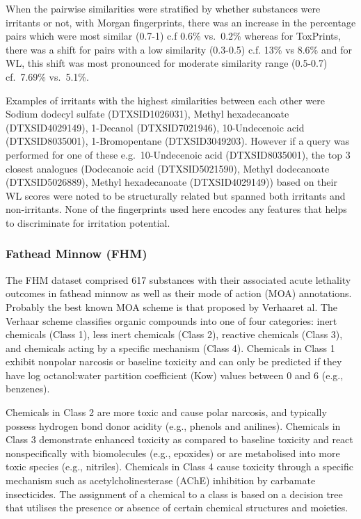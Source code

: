 \documentclass[
  super,
  preprint,
  3p]{elsarticle}
\begin{document}
When the pairwise similarities were stratified by whether substances
were irritants or not, with Morgan fingerprints, there was an increase
in the percentage pairs which were most similar (0.7-1) c.f 0.6\%
vs.~0.2\% whereas for ToxPrints, there was a shift for pairs with a low
similarity (0.3-0.5) c.f. 13\% vs 8.6\% and for WL, this shift was most
pronounced for moderate similarity range (0.5-0.7) cf.~7.69\% vs.~5.1\%.

Examples of irritants with the highest similarities between each other
were Sodium dodecyl sulfate (DTXSID1026031), Methyl hexadecanoate
(DTXSID4029149), 1-Decanol (DTXSID7021946), 10-Undecenoic acid
(DTXSID8035001), 1-Bromopentane (DTXSID3049203). However if a query was
performed for one of these e.g.~10-Undecenoic acid (DTXSID8035001), the
top 3 closest analogues (Dodecanoic acid (DTXSID5021590), Methyl
dodecanoate (DTXSID5026889), Methyl hexadecanoate (DTXSID4029149)) based
on their WL scores were noted to be structurally related but spanned
both irritants and non-irritants. None of the fingerprints used here
encodes any features that helps to discriminate for irritation
potential.

\subsubsection{Fathead Minnow (FHM)}\label{sec-fhm}

The FHM dataset comprised 617 substances with their associated acute
lethality outcomes in fathead minnow as well as their mode of action
(MOA) annotations. Probably the best known MOA scheme is that proposed
by Verhaaret al\citep{verhaar_1992}. The Verhaar scheme classifies
organic compounds into one of four categories: inert chemicals (Class
1), less inert chemicals (Class 2), reactive chemicals (Class 3), and
chemicals acting by a specific mechanism (Class 4). Chemicals in Class 1
exhibit nonpolar narcosis or baseline toxicity and can only be predicted
if they have log octanol:water partition coefficient (Kow) values
between 0 and 6 (e.g., benzenes).

Chemicals in Class 2 are more toxic and cause polar narcosis, and
typically possess hydrogen bond donor acidity (e.g., phenols and
anilines). Chemicals in Class 3 demonstrate enhanced toxicity as
compared to baseline toxicity and react nonspecifically with
biomolecules (e.g., epoxides) or are metabolised into more toxic species
(e.g., nitriles). Chemicals in Class 4 cause toxicity through a specific
mechanism such as acetylcholinesterase (AChE) inhibition by carbamate
insecticides. The assignment of a chemical to a class is based on a
decision tree that utilises the presence or absence of certain chemical
structures and moieties.
\end{document}
